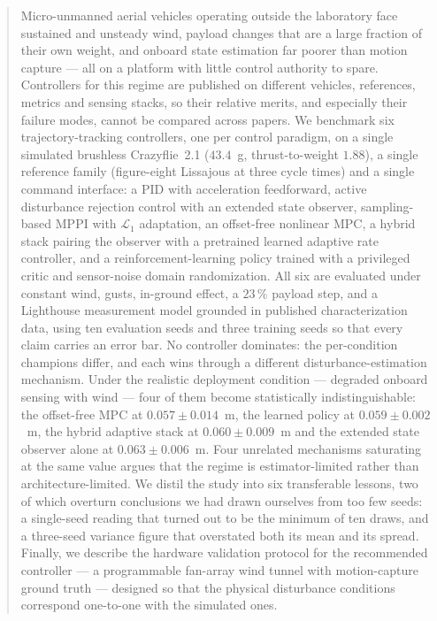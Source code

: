 
\begin{abstract}
Micro-unmanned aerial vehicles operating outside the laboratory face sustained and
unsteady wind, payload changes that are a large fraction of their own weight, and
onboard state estimation far poorer than motion capture --- all on a platform with
little control authority to spare. Controllers for this regime are published on
different vehicles, references, metrics and sensing stacks, so their relative merits,
and especially their failure modes, cannot be compared across papers. We benchmark six
trajectory-tracking controllers, one per control paradigm, on a single simulated
brushless Crazyflie~2.1 ($43.4$~g, thrust-to-weight $1.88$), a single reference family
(figure-eight Lissajous at three cycle times) and a single command interface: a PID with
acceleration feedforward, active disturbance rejection control with an extended state
observer, sampling-based MPPI with $\mathcal{L}_1$ adaptation, an offset-free nonlinear
MPC, a hybrid stack pairing the observer with a pretrained learned adaptive rate
controller, and a reinforcement-learning policy trained with a privileged critic and
sensor-noise domain randomization. All six are evaluated under constant wind, gusts,
in-ground effect, a $23\,\%$ payload step, and a Lighthouse measurement model grounded
in published characterization data, using ten evaluation seeds and three training seeds
so that every claim carries an error bar. No controller dominates: the per-condition
champions differ, and each wins through a different disturbance-estimation mechanism.
Under the realistic deployment condition --- degraded onboard sensing with wind --- four
of them become statistically indistinguishable: the offset-free MPC at
$0.057\pm0.014$~m, the learned policy at $0.059\pm0.002$~m, the hybrid adaptive stack at
$0.060\pm0.009$~m and the extended state observer alone at $0.063\pm0.006$~m. Four
unrelated mechanisms saturating at the same value argues that the regime is
estimator-limited rather than architecture-limited. We
distil the study into six transferable lessons, two of which overturn conclusions we had
drawn ourselves from too few seeds: a single-seed reading that turned out to be the
minimum of ten draws, and a three-seed variance figure that overstated both its mean and
its spread. Finally, we describe the hardware
validation protocol for the recommended controller --- a programmable fan-array wind
tunnel with motion-capture ground truth --- designed so that the physical disturbance
conditions correspond one-to-one with the simulated ones.
\end{abstract}

